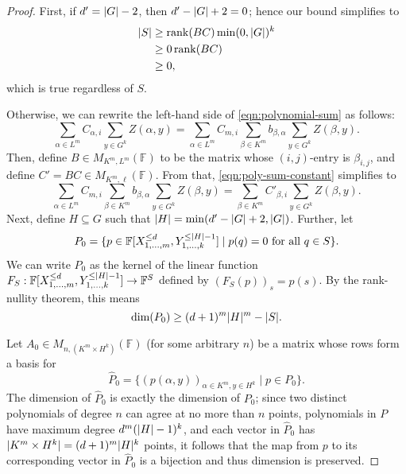 \documentclass[english,12pt]{reedthesis}
\theoremstyle{plain}
\theoremstyle{definition}
\theoremstyle{remark}
\DeclareMathOperator{\rk}{rank}
\DeclarePairedDelimiter{\abs}{\lvert}{\rvert}
\begin{document}
\begin{proof}
  First, if $d' = \abs{G} - 2$, then $d' - \abs{G} + 2 = 0$; hence our bound
  simplifies to
  \begin{align*}
    \abs{S} &\ge \rk(BC)\min(0, \abs{G})^{k} \\
            &\ge 0\rk(BC) \\
            &\ge 0,
  \end{align*}
  which is true regardless of $S$.

  Otherwise, we can rewrite the left-hand side of \cref{eqn:polynomial-sum} as
  follows:
  \begin{equation}\label{eqn:poly-sum-constant}
    \sum_{\alpha \in L^{m}}C_{\alpha,i}\sum_{y \in G^{k}}Z(\alpha,y) = \sum_{\alpha \in L^{m}}C_{m,i}\sum_{\beta \in K^{m}}b_{\beta,\alpha}\sum_{y \in G^{k}}Z(\beta,y).
  \end{equation}
  Then, define $B \in M_{K^{m},L^{m}}(\mathbb{F})$ to be the matrix whose
  $(i,j)$-entry is $\beta_{i,j}$, and define $C' = BC \in M_{K^{m},\ell}(\mathbb{F})$.
  From that, \cref{eqn:poly-sum-constant} simplifies to
  \begin{equation}\label{eqn:poly-sum-prime}
    \sum_{\alpha \in L^{m}}C_{m,i}\sum_{\beta \in K^{m}}b_{\beta,\alpha}\sum_{y \in G^{k}}Z(\beta,y) = \sum_{\beta \in K^{m}}C'_{\beta,i}\sum_{y \in G^{k}}Z(\beta,y).
  \end{equation}
  Next, define $H \subseteq G$ such that $\abs{H} = \min(d' - \abs{G} + 2, \abs{G})$.
  Further, let
  \[
    P_{0} = \{p \in \mathbb{F}[X_{1, \ldots, m}^{\le d}, Y_{1, \ldots, k}^{\le \abs{H} - 1}]
      \mid p(q) = 0 \text{ for all } q \in S\}.
  \]
  We can write $P_{0}$ as the kernel of the linear function
  $F_{S}: \mathbb{F}[X_{1, \ldots, m}^{\le d}, Y_{1, \ldots, k}^{\le \abs{H} - 1}] \rightarrow \mathbb{F}^{S}$
  defined by $(F_{S}(p))_{s} = p(s)$. By the rank-nullity theorem, this means
  \[
    \dim(P_{0}) \ge (d+1)^{m}\abs{H}^{m} - \abs{S}.
  \]

  Let $A_{0} \in M_{n,(K^{m} \times H^{k})}(\mathbb{F})$ (for some arbitrary $n$) be a
  matrix whose rows form a basis for
  \[
    \hat{P}_{0} = \{(p(\alpha,y))_{\alpha \in K^{m},y \in H^{k}} \mid p \in P_{0}\}.
  \]
  The dimension of $\hat{P}_{0}$ is exactly the dimension of $P_{0}$; since two
  distinct polynomials of degree $n$ can agree at no more than $n$ points,
  polynomials in $P$ have maximum degree $d^{m}(\abs{H}-1)^{k}$, and each vector
  in $\hat{P}_{0}$ has $\abs{K^{m} \times H^{k}} = (d+1)^{m}\abs{H}^{k}$ points, it
  follows that the map from $p$ to its corresponding vector in $\hat{P}_{0}$ is
  a bijection and thus dimension is preserved.


\end{proof}
\end{document}
